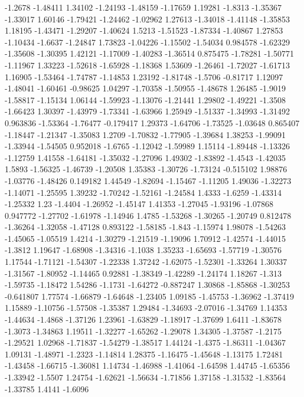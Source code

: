 \documentclass[9pt]{article}
\theoremstyle{plain}
\theoremstyle{definition}
\theoremstyle{remark}
\numberwithin{equation}{section}
\begin{document}
-1.2678
-1.48411
1.34102
-1.24193
-1.48159
-1.17659
1.19281
-1.8313
-1.35367
-1.33017
1.60146
-1.79421
-1.24462
-1.02962
1.27613
-1.34018
-1.41148
-1.35853
1.18195
-1.43471
-1.29207
-1.40624
1.5213
-1.51523
-1.87334
-1.40867
1.27853
-1.10434
-1.6637
-1.24847
1.73823
-1.04226
-1.15502
-1.54034
0.984578
-1.62329
-1.35608
-1.30395
1.42121
-1.17009
-1.40283
-1.36514
0.875475
-1.78281
-1.50771
-1.11967
1.33223
-1.52618
-1.65928
-1.18368
1.53609
-1.26461
-1.72027
-1.61713
1.16905
-1.53464
-1.74787
-1.14853
1.23192
-1.81748
-1.5706
-0.81717
1.12097
-1.48041
-1.60461
-0.98625
1.04297
-1.70358
-1.50955
-1.48678
1.26485
-1.9019
-1.58817
-1.15134
1.06144
-1.59923
-1.13076
-1.21441
1.29802
-1.49221
-1.3508
-1.66423
1.30397
-1.43979
-1.73341
-1.63966
1.25949
-1.51337
-1.34993
-1.31492
0.963836
-1.53364
-1.76477
-0.179417
1.29373
-1.64706
-1.73525
-1.03648
0.865407
-1.18447
-1.21347
-1.35083
1.2709
-1.70832
-1.77905
-1.39684
1.38253
-1.99091
-1.33944
-1.54505
0.952018
-1.6765
-1.12042
-1.59989
1.15114
-1.89448
-1.13326
-1.12759
1.41558
-1.64181
-1.35032
-1.27096
1.49302
-1.83892
-1.4543
-1.42035
1.5893
-1.56325
-1.46739
-1.20508
1.35383
-1.30726
-1.73124
-0.515102
1.98876
-1.03776
-1.48426
0.149182
1.44549
-1.82694
-1.15467
-1.11205
1.49036
-1.32273
-1.14071
-1.25595
1.39232
-1.70242
-1.52161
-1.24584
1.4333
-1.6259
-1.43314
-1.25332
1.23
-1.4404
-1.26952
-1.45147
1.41353
-1.27045
-1.93196
-1.07868
0.947772
-1.27702
-1.61978
-1.14946
1.4785
-1.53268
-1.30265
-1.20749
0.812478
-1.36264
-1.32058
-1.47128
0.893122
-1.58185
-1.843
-1.15974
1.98078
-1.54263
-1.45065
-1.05519
1.4214
-1.30279
-1.21519
-1.19096
1.70912
-1.42574
-1.44015
-1.3812
1.19647
-1.68908
-1.34316
-1.1038
1.35233
-1.65693
-1.57719
-1.30576
1.17544
-1.71121
-1.54307
-1.22338
1.37242
-1.62075
-1.52301
-1.33264
1.30337
-1.31567
-1.80952
-1.14465
0.92881
-1.38349
-1.42289
-1.24174
1.18267
-1.313
-1.59735
-1.18472
1.54286
-1.1731
-1.64272
-0.887247
1.30868
-1.85868
-1.30253
-0.641807
1.77574
-1.66879
-1.64648
-1.23405
1.09185
-1.45753
-1.36962
-1.37419
1.15889
-1.10756
-1.57508
-1.35387
1.29484
-1.34693
-2.07016
-1.34769
1.14353
-1.44634
-1.4868
-1.37126
1.23961
-1.63829
-1.18917
-1.37699
1.6411
-1.83678
-1.3073
-1.34863
1.19511
-1.32277
-1.65262
-1.29078
1.34305
-1.37587
-1.2175
-1.29521
1.02968
-1.71837
-1.54279
-1.38517
1.44124
-1.4375
-1.86311
-1.04367
1.09131
-1.48971
-1.2323
-1.14814
1.28375
-1.16475
-1.45648
-1.13175
1.72481
-1.43458
-1.66715
-1.36081
1.14734
-1.46988
-1.41064
-1.64598
1.44745
-1.65356
-1.33942
-1.5507
1.24754
-1.62621
-1.56634
-1.71856
1.37158
-1.31532
-1.83564
-1.33785
1.4141
-1.6096
\end{document}
